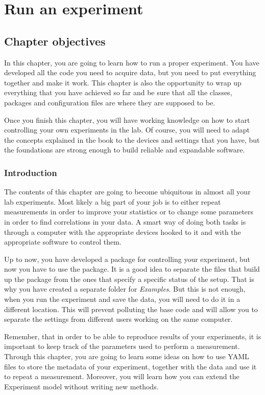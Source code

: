 \chapter{Run an experiment}\label{run-anexperiment}

\section{Chapter objectives}\label{chapterobjectives}
In this chapter, you are going to learn how to run a proper experiment.
You have developed all the code you need to acquire data, but you need
to put everything together and make it work. This chapter is also the
opportunity to wrap up everything that you have achieved so far and be
sure that all the classes, packages and configuration files are where
they are supposed to be.

Once you finish this chapter, you will have working knowledge on how to
start controlling your own experiments in the lab. Of course, you will
need to adapt the concepts explained in the book to the devices and
settings that you have, but the foundations are strong enough to build
reliable and expandable software.

\subsection{Introduction}\label{introduction}
The contents of this chapter are going to become ubiquitous in almost
all your lab experiments. Most likely a big part of your job is to
either repeat measurements in order to improve your statistics or to
change some parameters in order to find correlations in your data. A
smart way of doing both tasks is through a computer with the appropriate
devices hooked to it and with the appropriate software to control them.

Up to now, you have developed a package for controlling your experiment,
but now you have to use the package. It is a good idea to separate the
files that build up the package from the ones that specify a specific
status of the setup. That is why you have created a separate folder for
\emph{Examples}. But this is not enough, when you run the experiment and
save the data, you will need to do it in a different location. This will
prevent polluting the base code and will allow you to separate the
settings from different users working on the same computer.

Remember, that in order to be able to reproduce results of your
experiments, it is important to keep track of the parameters used to
perform a measurement. Through this chapter, you are going to learn some
ideas on how to use {YAML} files to store the metadata of your
experiment, together with the data and use it to repeat a measurement.
Moreover, you will learn how you can extend the Experiment model without
writing new methods.

